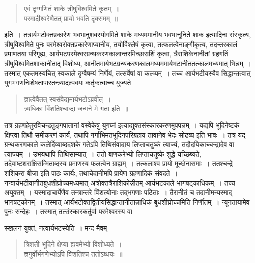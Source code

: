 \documentclass[11pt, openany]{book}
\begin{document}
\begin{quote}
{\qt एवं दृग्गणितं शाके त्रीषुविश्वमिते कृतम्~।\\
 परमादीश्वरेणैतत् प्रायो भवति दृक्समम्~॥}
\end{quote}

\newpage

\noindent इति~। तत्रार्यभटोक्तप्रकारेण भवभानुशबरयोगमिते शाके मध्यममानीय भवभानूनिते शाक इत्यादिना संस्कृत्य, त्रीषुविश्वमिते पुनः परमेश्वरोक्तप्रकारेणाप्यानीय, तयोर्विश्लेषं कृत्वा, तत्फलत्वेनाङ्गीकृत्य, तदन्तरकालं प्रमाणतया परिगृह्य, आर्यभटपरमेश्वरग्रन्थकरणकालान्तरमिच्छाराशिं कृत्वा, त्रैराशिकेनानीतां ग्रहगतिं त्रीषुविश्वमितशाकानीताद् विशोध्य,
आनीतमार्यभटग्रन्थकरणकालमध्यममार्यभटानीततत्कालमध्यमात् भिन्नम्~। तस्मात् एकतमस्यचित् स्वकाले दृग्वैषम्यं निर्णेयं, तत्सर्वेषां वा
कल्प्यम्~। तच्च आर्यभटीयस्यैव सिद्धान्तत्वात् युगभगणनिःशेषतापारतन्त्र्यादल्पवयः कर्तृकत्वाच्च युज्यते\textendash 

\begin{quote}
{\qt ज्ञात्वेवैतत् स्वसंवेद्यमार्यभटोऽब्रवीत्~।\\
 त्र्यधिका विंशतिश्चाब्दा जन्मने मे गता इति~॥}
\end{quote}

\noindent तत्र ग्रहणहेतुरविचन्द्रतुङ्गपातानां {\qt वस्वेकेषु युगघ्नं} इत्याद्युक्तसंस्कारकरणमुपपन्नम्~। यद्यपि भूदिनेष्टकं क्षिप्त्वा तिथौ समीकरणं कार्यं, तथापि गर्गाभिमतभूदिनपरिग्रहाय तावानेव भेदः सोढव्य इति भावः~। तत्र यद् ग्रन्थकरणकाले कलेर्दिव्याब्ददशके गतेऽपि तिथिसंवादाय लिप्ताचतुष्कं त्याज्यं, तदौदयिकाच्चन्द्रादेव वा त्याज्यम्~। उभयथापि तिथिसाम्यात्~। ततो बाणकरेभ्यो लिप्ताचतुष्के शुद्धे यच्छिष्यते, तदेवाष्टशराक्षिसम्मिताब्दस्य प्रमाणस्य फलत्वेन ग्राह्यम्~। तत्कलाश्व प्रायो मूर्च्छनासमाः~। ततश्चन्द्रे शशिकरा बीजा इति पाठः कार्यः, तथाचेदानीमपि प्रायेण ग्रहणादिकं संवदते~। नन्वार्यभटीयानीतबुधशीघ्रोच्चमध्यमात् अत्रोक्तत्रैराशिकोन्नीतम् आर्यभटकाले भागषट्काधिकम्~।
तच्च अयुक्तम्~। यस्मादाचार्येणैव तन्त्रान्तरे विंशत्योनाः तद्भगणाः पठिताः~। तैरानीतं च तदानीमन्यस्माद् भागषट्कोनम्~। तस्मात् 
आर्यभटोक्तद्वितीयसिद्धान्तानीतान्नाधिकं बुधशीघ्रोच्चमिति निर्णीतम्~। न्यूनतायामेव पुनः सन्देहः~। तस्मात् तत्संस्कारकर्तुर्वा परमेश्वरस्य वा

\newpage

\noindent स्खलनं युक्तं, नत्वार्यभटस्येति~। मन्द मैवम्\textendash 
\begin{quote}
{\qt त्रिशती भूदिने क्षेप्या ह्यवमेभ्यो विशोध्यते~।\\
ज्ञगुर्वोर्भगणेभ्योऽपि विंशतिश्च ततोऽब्धयः~॥}
\end{quote}
\end{document}
